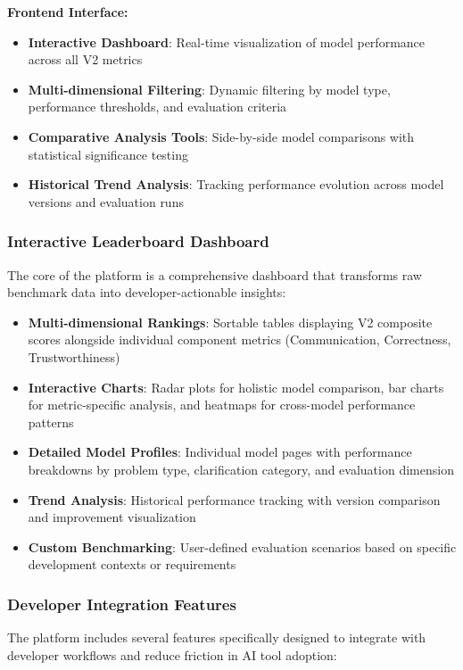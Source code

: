 \documentclass[conference]{IEEEtran}
\begin{document}
\textbf{Frontend Interface:}
\begin{itemize}
    \item \textbf{Interactive Dashboard}: Real-time visualization of model performance across all V2 metrics
    \item \textbf{Multi-dimensional Filtering}: Dynamic filtering by model type, performance thresholds, and evaluation criteria
    \item \textbf{Comparative Analysis Tools}: Side-by-side model comparisons with statistical significance testing
    \item \textbf{Historical Trend Analysis}: Tracking performance evolution across model versions and evaluation runs
\end{itemize}

\subsubsection{Interactive Leaderboard Dashboard}

The core of the platform is a comprehensive dashboard that transforms raw benchmark data into developer-actionable insights:

\begin{itemize}
    \item \textbf{Multi-dimensional Rankings}: Sortable tables displaying V2 composite scores alongside individual component metrics (Communication, Correctness, Trustworthiness)
    \item \textbf{Interactive Charts}: Radar plots for holistic model comparison, bar charts for metric-specific analysis, and heatmaps for cross-model performance patterns
    \item \textbf{Detailed Model Profiles}: Individual model pages with performance breakdowns by problem type, clarification category, and evaluation dimension
    \item \textbf{Trend Analysis}: Historical performance tracking with version comparison and improvement visualization
    \item \textbf{Custom Benchmarking}: User-defined evaluation scenarios based on specific development contexts or requirements
\end{itemize}

\subsubsection{Developer Integration Features}

The platform includes several features specifically designed to integrate with developer workflows and reduce friction in AI tool adoption:
\end{document}
